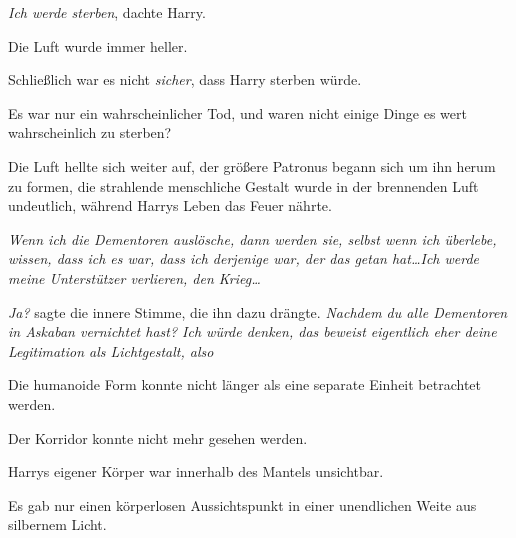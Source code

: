 \emph{Ich werde sterben}, dachte Harry.

Die Luft wurde immer heller.

Schließlich war es nicht \emph{sicher}, dass Harry sterben würde.

Es war nur ein wahrscheinlicher Tod, und waren nicht einige Dinge es wert wahrscheinlich zu sterben?

Die Luft hellte sich weiter auf, der größere Patronus begann sich um ihn herum zu formen, die strahlende menschliche Gestalt wurde in der brennenden Luft undeutlich, während Harrys Leben das Feuer nährte.

\emph{Wenn ich die Dementoren auslösche, dann werden sie, selbst wenn ich überlebe, wissen, dass ich es war, dass ich derjenige war, der das getan hat…Ich werde meine Unterstützer verlieren, den Krieg…}

\emph{Ja?} sagte die innere Stimme, die ihn dazu drängte. \emph{Nachdem du alle Dementoren in Askaban vernichtet hast? Ich würde denken, das beweist eigentlich eher deine Legitimation als Lichtgestalt, also }

Die humanoide Form konnte nicht länger als eine separate Einheit betrachtet werden.

Der Korridor konnte nicht mehr gesehen werden.

Harrys eigener Körper war innerhalb des Mantels unsichtbar.

Es gab nur einen körperlosen Aussichtspunkt in einer unendlichen Weite aus silbernem Licht.

